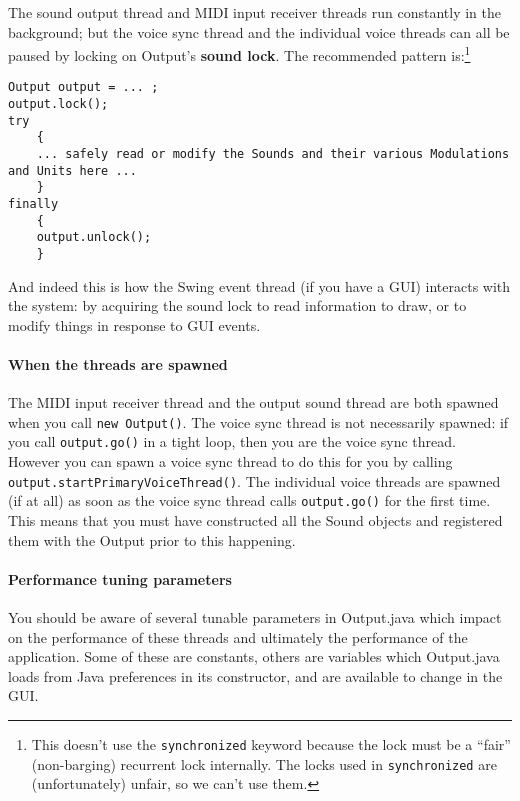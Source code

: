 \documentclass{article}
\newcommand\bump{\vspace{20in}}
\begin{document}
The sound output thread and MIDI input receiver threads run constantly in the background; but the voice sync thread and the individual voice threads can all be paused by locking on Output's {\bf sound lock}.  The recommended pattern is:\footnote{This doesn't use the {\tt synchronized} keyword because the lock must be a ``fair'' (non-barging) recurrent lock internally.  The locks used in {\tt synchronized} are (unfortunately) unfair, so we can't use them.}

\bump

\begin{verbatim}
Output output = ... ;
output.lock();
try
    {
    ... safely read or modify the Sounds and their various Modulations and Units here ...
    }
finally
    {
    output.unlock();
    }
\end{verbatim}

And indeed this is how the Swing event thread (if you have a GUI) interacts with the system: by acquiring the sound lock to read information to draw, or to modify things in response to GUI events.

\paragraph{When the threads are spawned}  The MIDI input receiver thread and the output sound thread are both spawned when you call {\tt new Output()}.  The voice sync thread is not necessarily spawned: if you call {\tt output.go()} in a tight loop, then you are the voice sync thread.  However you can spawn a voice sync thread to do this for you by calling {\tt output.startPrimaryVoiceThread()}.  The individual voice threads are spawned (if at all) as soon as the voice sync thread calls {\tt output.go()} for the first time.  This means that you must have constructed all the Sound objects and registered them with the Output prior to this happening.

\paragraph{Performance tuning parameters} You should be aware of several tunable parameters in Output.java which impact on the performance of these threads and ultimately the performance of the application.  Some of these are constants, others are variables which Output.java loads from Java preferences in its constructor, and are available to change in the GUI.
\end{document}
